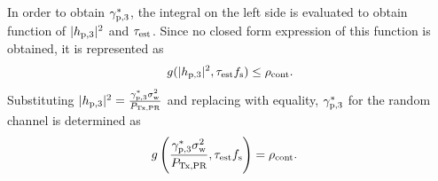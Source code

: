 {In order to obtain ${\gamma}_{\text{p,3}}^*$, the integral on the left side is evaluated to obtain function of $|h_{\text{p,3}}|^2$ and $\tau_{\text{est}}$. Since no closed form expression of this function is obtained, it is represented as}
\begin{align*}
g(|h_{\text{p,3}}|^2, \tau_{\text{est}} f_{\text{s}}) \le \rho_{\text{cont}}. \nonumber   
\end{align*}
{Substituting $|h_{\text{p,3}}|^2 = \frac{{\gamma}_{\text{p,3}}^* \sigma^2_{\text{w}}}{P_{\text{Tx,PR}}}$ and replacing with equality, ${\gamma}_{\text{p,3}}^*$ for the random channel is determined as} 
\begin{align*}
g\left(\frac{{\gamma}_{\text{p,3}}^* \sigma^2_{\text{w}}}{P_{\text{Tx,PR}}}, \tau_{\text{est}} f_{\text{s}}\right) &= \rho_{\text{cont}}. \nonumber  
\end{align*}
\begin{figure}[!ht]


\centering
{}
\end{figure}
